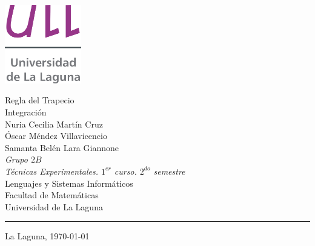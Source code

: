 \documentclass[spanish,a4paper,11pt,twoside]{report}
\begin{document}
\pagestyle{empty}
\thispagestyle{empty}

\newcommand{\HRule}{\rule{\linewidth}{1mm}}
\setlength{\parindent}{0mm}
\setlength{\parskip}{0mm}

\begin{center}
\includegraphics[width=0.25\textwidth]{images/logotipo-secundario-ULL}
\end{center}


\begin{center}
        {\Huge Regla del Trapecio} \\[4.0mm] 
        {\Huge Integración} \\[3.0mm]
        {\Large Nuria Cecilia Martín Cruz\\
                Óscar Méndez Villavicencio\\
                Samanta Belén Lara Giannone}\\[5mm]
        {\Large \textit{Grupo $2B$}} \\[5mm]


        {\em Técnicas Experimentales. $1^{er}$ curso. $2^{do}$ semestre} \\[10mm]
        Lenguajes y Sistemas Informáticos \\[5mm]
        Facultad de Matemáticas \\[5mm]
        
        Universidad de La Laguna \\
\end{center}
\HRule
{}
\begin{center}
  La Laguna, \today 
\end{center}



\renewcommand{\thepage}{\roman{page}}
\setcounter{page}{1}


\tableofcontents

\newpage{\pagestyle{empty}\cleardoublepage}
\end{document}
